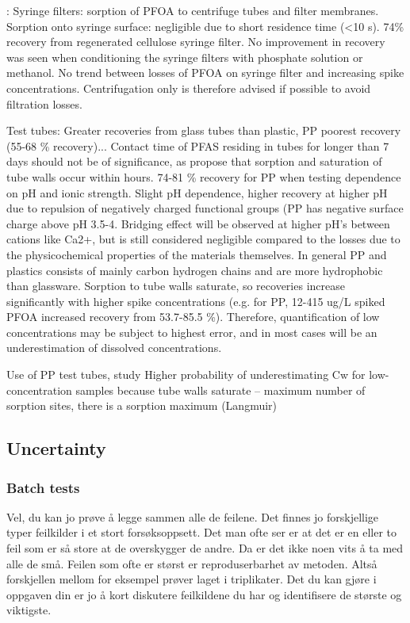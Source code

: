 \citep{Lath2019labsorb}: 
Syringe filters: sorption of PFOA to centrifuge tubes and filter membranes. Sorption onto syringe surface: negligible due to short residence time (\textless 10 s). 74\% recovery from regenerated cellulose syringe filter. No improvement in recovery was seen when conditioning the syringe filters with phosphate solution or methanol. No trend between losses of PFOA on syringe filter and increasing spike concentrations. Centrifugation only is therefore advised if possible to avoid filtration losses. 

Test tubes: Greater recoveries from glass tubes than plastic, PP poorest recovery (55-68 \% recovery)... Contact time of PFAS residing in tubes for longer than 7 days should not be of significance, as \citep{Lath2019labsorb} propose that sorption and saturation of tube walls occur within hours. 74-81 \% recovery for PP when testing dependence on pH and ionic strength. Slight pH dependence, higher recovery at higher pH due to repulsion of negatively charged functional groups (PP has negative surface charge above pH 3.5-4. Bridging effect will be observed at higher pH's between cations like Ca2+, but is still considered negligible compared to the losses due to the physicochemical properties of the materials themselves. In general PP and plastics consists of mainly carbon hydrogen chains and are more hydrophobic than glassware. Sorption to tube walls saturate, so recoveries increase significantly with higher spike concentrations (e.g. for PP, 12-415 ug/L spiked PFOA increased recovery from 53.7-85.5 \%). Therefore, quantification of low concentrations may be subject to highest error, and in most cases will be an underestimation of dissolved concentrations. 

Use of PP test tubes, study
Higher probability of underestimating Cw for low-concentration samples because tube walls saturate – maximum number of sorption sites, there is a sorption maximum (Langmuir)

\subsection{Uncertainty}
\subsubsection{Batch tests}
Vel, du kan jo prøve å legge sammen alle de feilene. Det finnes jo forskjellige typer feilkilder i et stort forsøksoppsett. Det man ofte ser er at det er en eller to feil som er så store at de overskygger de andre. Da er det ikke noen vits å ta med alle de små. Feilen som ofte er størst er reproduserbarhet av metoden. Altså forskjellen mellom for eksempel prøver laget i triplikater. Det du kan gjøre i oppgaven din er jo å kort diskutere feilkildene du har og identifisere de største og viktigste.

